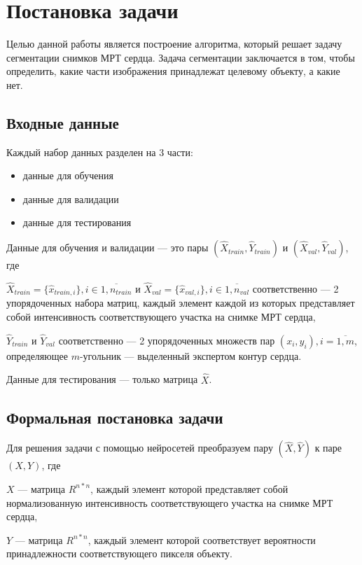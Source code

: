 \section{Постановка задачи}

Целью данной работы является построение алгоритма, который решает задачу сегментации снимков МРТ сердца. Задача сегментации заключается в том, чтобы определить, какие части изображения принадлежат целевому объекту, а какие нет. 

\subsection{Входные данные}

Каждый набор данных разделен на 3 части: 

\begin{itemize}
  \item данные для обучения
  \item данные для валидации
  \item данные для тестирования
\end{itemize}

Данные для обучения и валидации — это пары $(\hat{X}_{train},\hat{Y}_{train})$ и $(\hat{X}_{val},\hat{Y}_{val})$, где

  $\hat{X}_{train} = \{\hat{x}_{train,i}\},i\in{}\overline{1,n_{train}}$ и $\hat{X}_{val} = \{\hat{x}_{val,i}\},i\in{}\overline{1,n_{val}}$ соответственно — 2 упорядоченных набора матриц, каждый элемент каждой из которых представляет собой интенсивность соответствующего участка на снимке МРТ сердца,
  
  $\hat{Y}_{train}$ и $\hat{Y}_{val}$ соответственно — 2 упорядоченных множеств пар $(x_{i},y_{i}), i = \overline{1,m}$, определяющее \mbox{$m$-угольник} — выделенный экспертом контур сердца.

Данные для тестирования — только матрица $\hat{X}$.

\subsection{Формальная постановка задачи}

Для решения задачи с помощью нейросетей преобразуем пару $(\hat{X},\hat{Y})$ к паре $(X,Y)$, где

  $X$ — матрица $R^{n*n}$, каждый элемент которой представляет собой нормализованную интенсивность соответствующего участка на снимке МРТ сердца,

  $Y$ — матрица $R^{n*n}$, каждый элемент которой соответствует вероятности принадлежности соответствующего пикселя объекту. 

